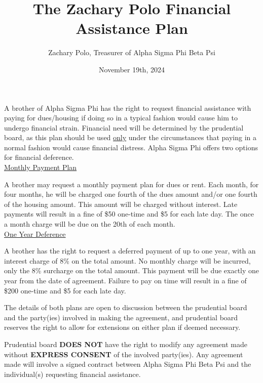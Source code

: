 \documentclass{article}
\title{The Zachary Polo Financial Assistance Plan}
\author{Zachary Polo, Treasurer of Alpha Sigma Phi Beta Psi}
\date{November 19th, 2024}
\begin{document}
\maketitle

A brother of Alpha Sigma Phi has the right to request financial assistance with paying for dues/housing if doing so in a typical fashion would cause him to undergo financial strain. Financial need will be determined by the prudential board, as this plan should be used \underline{only} under the circumstances that paying in a normal fashion would cause financial distress. Alpha Sigma Phi offers two options for financial deference.\\

\underline{Monthly Payment Plan}

A brother may request a monthly payment plan for dues or rent. Each month, for four months, he will be charged one fourth of the dues amount and/or one fourth of the housing amount. This amount will be charged without interest. Late payments will result in a fine of \$50 one-time and \$5 for each late day. The once a month charge will be due on the 20th of each month.\\

\underline{One Year Deference}

A brother has the right to request a deferred payment of up to one year, with an interest charge of 8\% on the total amount. No monthly charge will be incurred, only the 8\% surcharge on the total amount. This payment will be due exactly one year from the date of agreement. Failure to pay on time will result in a fine of \$200 one-time and \$5 for each late day.

The details of both plans are open to discussion between the prudential board and the party(ies) involved in making the agreement, and prudential board reserves the right to allow for extensions on either plan if deemed necessary.

Prudential board \textbf{DOES NOT} have the right to modify any agreement made without \textbf{EXPRESS CONSENT} of the involved party(ies). Any agreement made will involve a signed contract between Alpha Sigma Phi Beta Psi and the individual(s) requesting financial assistance.
\end{document}
